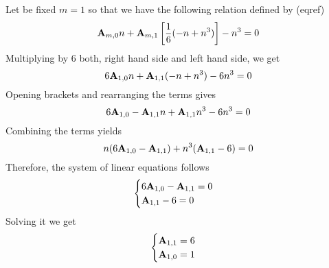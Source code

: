 \begin{examp}
    Let be fixed $m=1$ so that we have the following relation defined by (eqref)
    \begin{equation*}
        {\mathbf{A}} \sb{m,0} n + {\mathbf{A}} \sb{m,1} \left[ \frac{1}{6} (-n + n^3) \right] -n^3 = 0
    \end{equation*}
    Multiplying by $6$ both, right hand side and left hand side, we get
    \begin{equation*}
        6{\mathbf{A}} \sb{1,0} n + {\mathbf{A}} \sb{1,1} (-n + n^3) - 6n^3 = 0
    \end{equation*}
    Opening brackets and rearranging the terms gives
    \begin{equation*}
        6 {\mathbf{A}} \sb{1,0} - {\mathbf{A}} \sb{1,1} n + {\mathbf{A}} \sb{1,1} n^3 - 6n^3 = 0
    \end{equation*}
    Combining the terms yields
    \begin{equation*}
        n(6{\mathbf{A}} \sb{1,0} - {\mathbf{A}} \sb{1,1}) + n^3 ({\mathbf{A}} \sb{1,1} - 6) = 0
    \end{equation*}
    Therefore, the system of linear equations follows
    \begin{equation*}
        \begin{cases}
            6 {\mathbf{A}} \sb{1,0} - {\mathbf{A}} \sb{1,1} = 0 \\
            {\mathbf{A}} \sb{1,1} - 6 = 0
        \end{cases}
    \end{equation*}
    Solving it we get
    \begin{equation*}
        \begin{cases}
            {\mathbf{A}} \sb{1,1} = 6 \\
            {\mathbf{A}} \sb{1,0} = 1
        \end{cases}
    \end{equation*}
\end{examp}